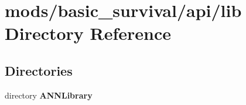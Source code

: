 \section{mods/basic\+\_\+survival/api/lib Directory Reference}
\label{dir_4eaf40bdf4fa0d6b8311057d4cb18095}
\subsection*{Directories}
\begin{DoxyCompactItemize}
\item 
directory {\bf A\+N\+N\+Library}
\end{DoxyCompactItemize}
